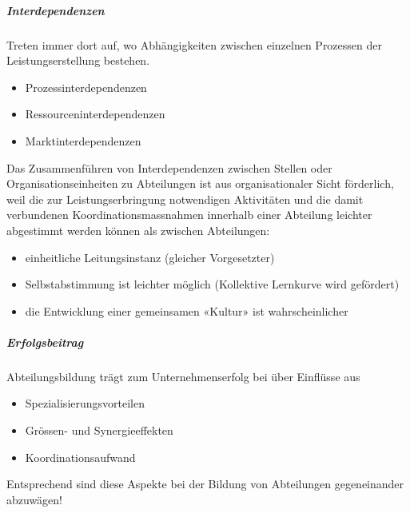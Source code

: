 \subparagraph{Interdependenzen}
Treten immer dort auf, wo Abhängigkeiten zwischen einzelnen Prozessen der Leistungserstellung bestehen.
\begin{itemize}
	\item Prozessinterdependenzen
	\item Ressourceninterdependenzen
	\item Marktinterdependenzen
\end{itemize}
Das Zusammenführen von Interdependenzen zwischen Stellen oder Organisationseinheiten zu Abteilungen ist aus organisationaler Sicht förderlich, weil die zur Leistungserbringung notwendigen Aktivitäten und die damit verbundenen Koordinationsmassnahmen innerhalb einer Abteilung leichter abgestimmt werden können als zwischen Abteilungen:
\begin{itemize}
	\item einheitliche Leitungsinstanz (gleicher Vorgesetzter)
	\item Selbstabstimmung ist leichter möglich (Kollektive Lernkurve wird gefördert)
	\item die Entwicklung einer gemeinsamen «Kultur» ist wahrscheinlicher
\end{itemize}

\subparagraph{Erfolgsbeitrag}
Abteilungsbildung trägt zum Unternehmenserfolg bei über Einflüsse aus
\begin{itemize}
	\item Spezialisierungsvorteilen
	\item Grössen- und Synergieeffekten
	\item Koordinationsaufwand
\end{itemize}
Entsprechend sind diese Aspekte bei der Bildung von Abteilungen gegeneinander abzuwägen!